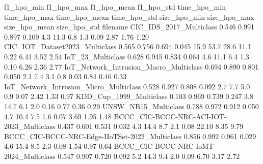                                                                     f1_hpo_min f1_hpo_max f1_hpo_mean f1_hpo_std time_hpo_min time_hpo_max time_hpo_mean time_hpo_std size_hpo_min size_hpo_max size_hpo_mean size_hpo_std
filename                                                                                                                                                                                                                  
CIC_IDS_2017_Multiclass                                                  0.546      0.991       0.897      0.109          4.3         11.3           6.8          1.3         0.09         2.87          1.76         1.20
CIC_IOT_Dataset2023_Multiclass                                           0.565      0.756       0.694      0.045         15.9         53.7          28.6         11.1         0.22         6.41          3.52         2.54
IoT_23_Multiclass                                                        0.628      0.945       0.834      0.064          4.6         11.1           6.4          1.3         0.10         6.26          2.36         2.77
IoT_Network_Intrusion_Macro_Multiclass                                   0.694      0.890       0.801      0.050          2.1          7.4           3.1          0.8         0.03         0.84          0.46         0.33
IoT_Network_Intrusion_Micro_Multiclass                                   0.528      0.927       0.808      0.092          2.7          7.7           5.0          0.9         0.07         2.42          1.33         0.97
KDD_Cup_1999_Multiclass                                                  0.103      0.969       0.739      0.247          3.8         14.7           6.1          2.0         0.16         0.77          0.36         0.29
UNSW_NB15_Multiclass                                                     0.788      0.972       0.912      0.050          4.7         10.4           7.5          1.6         0.07         3.69          1.95         1.48
BCCC_CIC-BCCC-NRC-ACI-IOT-2023_Multiclass                                0.437      0.601       0.531      0.032          4.3         14.4           8.7          2.1         0.08        22.10          8.35         9.79
BCCC_CIC-BCCC-NRC-Edge-IIoTSet-2022_Multiclass                           0.856      0.992       0.961      0.029          4.6         15.4           8.5          2.3         0.08         1.54          0.97         0.64
BCCC_CIC-BCCC-NRC-IoMT-2024_Multiclass                                   0.547      0.907       0.720      0.092          5.2         14.3           9.4          2.0         0.09         6.70          3.17         2.72
